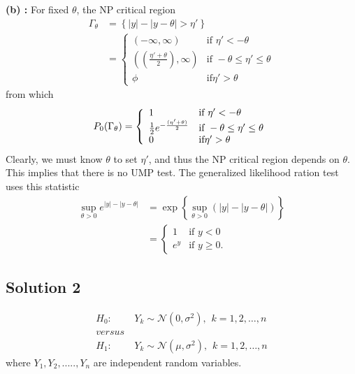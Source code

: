\documentclass[a4paper,english,12pt]{article}
\begin{document}
\textbf{(b) : } For fixed $\theta$, the NP critical region
\begin{align*}
\Gamma_{\theta}&=\left\{|y|-|y-\theta|>\eta'\right\} \\
			  &=\left\{
					\begin{array}{ll}
						(-\infty,\infty)  & \mbox{if } \eta'<-\theta\\
						((\frac{\eta'+\theta}{2}),\infty) & \mbox{if } -\theta\leq\eta'\leq\theta\\
						\phi & \mbox{if} \eta'>\theta
					\end{array}
				\right.
\end{align*}
from which
\begin{equation*}
\mathnormal{P}_0(\Gamma_{\theta})=\left\{
					\begin{array}{ll}
						1 & \mbox{if } \eta'<-\theta\\
						\frac{1}{2}e^{-\frac{(\eta'+\theta)}{2}} & \mbox{if } -\theta\leq\eta'\leq\theta\\
						 0 & \mbox{if} \eta'>\theta
					\end{array}
				\right.
\end{equation*}
Clearly, we must know $\theta$ to set $\eta'$, and thus the NP critical region depends on $\theta$. This implies that there is no UMP test. The generalized likelihood ration test uses this statistic 
\begin{align*}
\sup_{\theta>0}e^{|y|-|y-\theta|}&=\exp\left\{\sup_{\theta>0}(|y|-|y-\theta|)\right\} \\
			  &=\begin{cases}
						1  & \mbox{if } y<0\\
						e^{y} & \mbox{if } y\geq 0.
			  \end{cases}			 
\end{align*}
\hypertarget{solution2}{\subsection*{Solution 2}}
\begin{align*}
H_0:&~Y_k\sim \mathcal{N}(0,\sigma^2),\hspace{5pt}k=1,2,\dots,n\\
versus&\\
H_1:&~Y_k\sim \mathcal{N}(\mu,\sigma^2),\hspace{5pt}k=1,2,\dots,n
\end{align*}
where $Y_1,Y_2,.....,Y_n$ are independent random variables.
\end{document}

